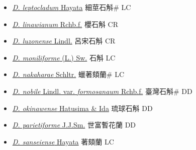 \begin{itemize}
\begin{itemize}
        \item[] \href{http://www.theplantlist.org/tpl1.1/search?q=Dendrobium+leptocladum}{\textit{D. leptocladum} Hayata}   細莖石斛\# LC
        \item[] \href{http://www.theplantlist.org/tpl1.1/search?q=Dendrobium+linawianum}{\textit{D. linawianum} Rchb.f.}   櫻石斛 CR
        \item[] \href{http://www.theplantlist.org/tpl1.1/search?q=Dendrobium+luzonense}{\textit{D. luzonense} Lindl.}   呂宋石斛 CR
        \item[] \href{http://www.theplantlist.org/tpl1.1/search?q=Dendrobium+moniliforme}{\textit{D. moniliforme} (L.) Sw.}   石斛 LC
        \item[] \href{http://www.theplantlist.org/tpl1.1/search?q=Dendrobium+nakaharae}{\textit{D. nakaharae} Schltr.}     蠟著頦蘭\# LC
        \item[] \href{http://www.theplantlist.org/tpl1.1/search?q=Dendrobium+nobile+var.+formosanaum}{\textit{D. nobile} Lindl. var. \textit{formosanaum} Rchb.f.}   臺灣石斛\# DD
        \item[] \href{http://www.theplantlist.org/tpl1.1/search?q=Dendrobium+okinawense}{\textit{D. okinawense} Hatusima \& Ida}   琉球石斛 DD
        \item[] \href{http://www.theplantlist.org/tpl1.1/search?q=Dendrobium+parietiforme}{\textit{D. parietiforme} J.J.Sm.}     世富暫花蘭 DD
        \item[] \href{http://www.theplantlist.org/tpl1.1/search?q=Dendrobium+sanseiense}{\textit{D. sanseiense} Hayata}     著頦蘭 LC

\end{itemize}
\end{itemize}
